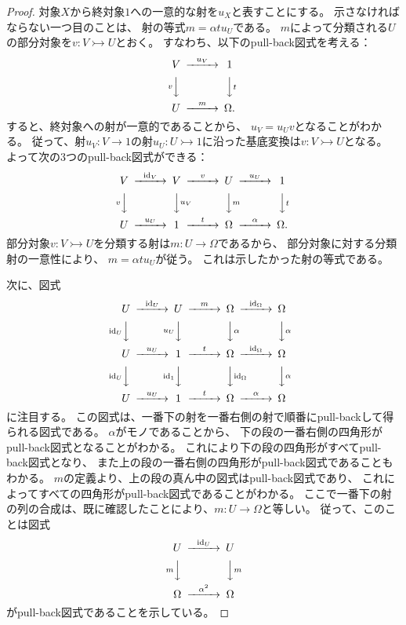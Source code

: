 \documentclass[uplatex]{jsarticle}
\theoremstyle{definition}
\def\id{\mathrm{id}}
\newcommand{\rtot}{\rightarrowtail}
\begin{document}
\begin{proof}
  対象\(X\)から終対象\(1\)への一意的な射を\(u_X\)と表すことにする。
  示さなければならない一つ目のことは、
  射の等式\(m = \alpha t u_U\)である。
  \(m\)によって分類される\(U\)の部分対象を\(v:V\rtot U\)とおく。
  すなわち、以下のpull-back図式を考える：
  \[
  \begin{CD}
    V @> u_V >> 1 \\
    @V v VV @VV t V \\
    U @> m >> \Omega.
  \end{CD}
  \]
  すると、終対象への射が一意的であることから、
  \(u_V = u_U v\)となることがわかる。
  従って、射\(u_V:V\to 1\)の射\(u_U: U\rtot 1\)に沿った基底変換は\(v:V\rtot U\)となる。
  よって次の3つのpull-back図式ができる：
  \[
  \begin{CD}
    V @> {\id_V} >> V @> v >> U @> u_U >> 1 \\
    @V v VV @VV {u_V} V @VV m V @VV t V \\
    U @> u_U >> 1 @> t >> \Omega @> \alpha >> \Omega.
  \end{CD}
  \]
  部分対象\(v:V\rtot U\)を分類する射は\(m:U\to \Omega\)であるから、
  部分対象に対する分類射の一意性により、
  \(m = \alpha t u_U\)が従う。
  これは示したかった射の等式である。

  次に、図式
  \[
  \begin{CD}
    U @> \id_U >> U @> m >> \Omega @> \id_{\Omega} >> \Omega \\
    @V \id_U VV @V u_U VV @VV \alpha V @VV \alpha V \\
    U @> u_U >> 1 @> t >> \Omega @> \id_{\Omega} >> \Omega \\
    @V \id_U VV @V \id_1 VV @VV \id_{\Omega} V @VV \alpha V \\
    U @> u_U >> 1 @> t >> \Omega @> \alpha >> \Omega
  \end{CD}
  \]
  に注目する。
  この図式は、一番下の射を一番右側の射で順番にpull-backして得られる図式である。
  \(\alpha\)がモノであることから、
  下の段の一番右側の四角形がpull-back図式となることがわかる。
  これにより下の段の四角形がすべてpull-back図式となり、
  また上の段の一番右側の四角形がpull-back図式であることもわかる。
  \(m\)の定義より、上の段の真ん中の図式はpull-back図式であり、
  これによってすべての四角形がpull-back図式であることがわかる。
  ここで一番下の射の列の合成は、既に確認したことにより、\(m : U\to \Omega\)と等しい。
  従って、このことは図式
  \[
  \begin{CD}
    U @> \id_U >> U \\
    @V m VV @VV m V \\
    \Omega @> \alpha^2 >> \Omega
  \end{CD}
  \]
  がpull-back図式であることを示している。


\end{proof}
\end{document}
